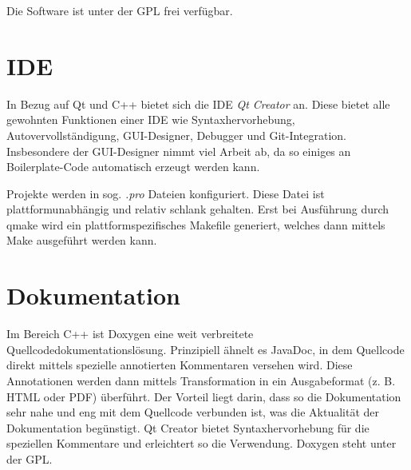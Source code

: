 Die Software ist unter der \ac{GPL} frei verfügbar.

\section{IDE} %

In Bezug auf Qt und C++ bietet sich die IDE \emph{Qt Creator} \cite{QtCreator} an. 
Diese bietet alle gewohnten Funktionen einer IDE wie Syntaxhervorhebung, Autovervollständigung, GUI-Designer, Debugger und Git-Integration.
Insbesondere der GUI-Designer nimmt viel Arbeit ab, da so einiges an Boilerplate-Code automatisch erzeugt werden kann.

Projekte werden in sog. \emph{.pro} Dateien konfiguriert. 
Diese Datei ist plattformunabhängig und relativ schlank gehalten. 
Erst bei Ausführung durch qmake wird ein plattformspezifisches Makefile generiert, welches dann mittels Make ausgeführt werden kann.

\section{Dokumentation} %

Im Bereich C++ ist Doxygen \cite{Doxygen} eine weit verbreitete Quellcodedokumentationslösung.
Prinzipiell ähnelt es JavaDoc, in dem Quellcode direkt mittels spezielle annotierten Kommentaren versehen wird.
Diese Annotationen werden dann mittels Transformation in ein Ausgabeformat (z. B. HTML oder PDF) überführt.
Der Vorteil liegt darin, dass so die Dokumentation sehr nahe und eng mit dem Quellcode verbunden ist, was die Aktualität der Dokumentation begünstigt.
Qt Creator bietet Syntaxhervorhebung für die speziellen Kommentare und erleichtert so die Verwendung.
Doxygen steht unter der \ac{GPL}.






























